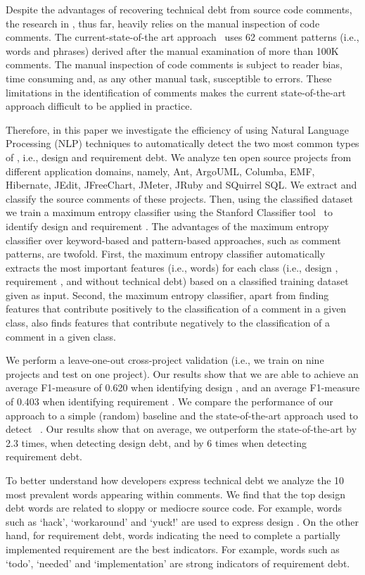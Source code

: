 Despite the advantages of recovering technical debt from source code comments, the research in \SATD, thus far, heavily relies on the manual inspection of code comments. The current-state-of-the art approach~\cite{Potdar2014ICSME} uses 62 comment patterns (i.e., words and phrases) derived after the manual examination of more than 100K comments. The manual inspection of code comments is subject to reader bias, time consuming and, as any other manual task, susceptible to errors. These limitations in the identification of \SATD comments makes the current state-of-the-art approach difficult to be applied in practice.

Therefore, in this paper we investigate the efficiency of using Natural Language Processing (NLP) techniques to automatically detect the two most common types of \SATD, i.e., design and requirement debt. We analyze ten open source projects from different application domains, namely, Ant, ArgoUML, Columba, EMF, Hibernate, JEdit, JFreeChart, JMeter, JRuby and SQuirrel SQL. We extract and classify the source comments of these projects. Then, using the classified dataset we train a maximum entropy classifier using the Stanford Classifier tool~\cite{manning2003optimization} to identify design and requirement \SATD.
The advantages of the maximum entropy classifier over keyword-based and pattern-based approaches, such as comment patterns, are twofold. First, the maximum entropy classifier automatically extracts the most important features (i.e., words) for each class (i.e., design \SATD, requirement \SATD, and without technical debt) based on a classified training dataset given as input. Second, the maximum entropy classifier, apart from finding features that contribute positively to the classification of a comment in a given class, also finds features that contribute negatively to the classification of a comment in a given class.

We perform a leave-one-out cross-project validation (i.e., we train on nine projects and test on one project). Our results show that we are able to  achieve an average F1-measure of 0.620 when identifying design \SATD, and an average F1-measure of 0.403 when identifying requirement \SATD. We compare the performance of our approach to a simple (random) baseline and the state-of-the-art approach used to detect \SATD~\cite{Potdar2014ICSME}. Our results show that on average, we outperform the state-of-the-art by 2.3 times, when detecting design debt, and by 6 times when detecting requirement debt.

To better understand how developers express technical debt we analyze the 10 most prevalent words appearing within \SATD comments. 
We find that the top design debt words are related to sloppy or mediocre source code. For example, words such as `hack', `workaround' and `yuck!' are used to express design \SATD. On the other hand, for requirement debt, words indicating the need to complete a partially implemented requirement are the best indicators. For example, words such as `todo', `needed' and `implementation' are strong indicators of requirement debt. 

